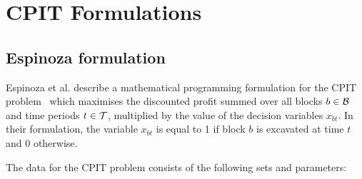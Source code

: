 \documentclass[journal]{IEEEtran}
\begin{document}
\ifCLASSOPTIONcaptionsoff
  \newpage
\fi






% 

%


\clearpage
\appendices
\section{CPIT Formulations}\label{app:cpit}
\subsection*{Espinoza formulation}
Espinoza et al. describe a mathematical programming formulation for the CPIT problem~\cite{minelib} which maximises the discounted profit summed over all blocks $b \in \S{B}$ and time periods $t \in \S{T}$, multiplied by the value of the decision variables $x_{bt}$. In their formulation, the variable $x_{bt}$ is equal to 1 if block $b$ is excavated at time $t$ and 0 otherwise.\par 

The data for the CPIT problem consists of the following sets and parameters:
\end{document}
